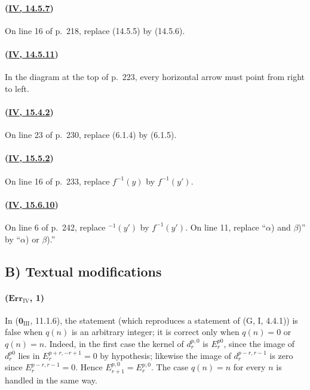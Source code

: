 \paragraph{({\texorpdfstring{\protect\hyperref[IV.14.5.7]{\textbf{IV}, 14.5.7}}{IV, 14.5.7}})}
On line 16 of p.~218, replace (14.5.5) by (14.5.6).

\paragraph{({\texorpdfstring{\protect\hyperref[IV.14.5.11]{\textbf{IV}, 14.5.11}}{IV, 14.5.11}})}
In the diagram at the top of p.~223, every horizontal arrow must point
from right to left.

\paragraph{({\texorpdfstring{\protect\hyperref[IV.15.4.2]{\textbf{IV}, 15.4.2}}{IV, 15.4.2}})}
On line 23 of p.~230, replace (6.1.4) by (6.1.5).

\paragraph{({\texorpdfstring{\protect\hyperref[IV.15.5.2]{\textbf{IV}, 15.5.2}}{IV, 15.5.2}})}
On line 16 of p.~233, replace $f^{-1}(y)$ by $f^{-1}(y')$.

\paragraph{({\texorpdfstring{\protect\hyperref[IV.15.6.10]{\textbf{IV}, 15.6.10}}{IV, 15.6.10}})}
On line 6 of p.~242, replace ${}^{-1}(y')$ by $f^{-1}(y')$.  On line
11, replace ``$\alpha$) and $\beta$)'' by ``$\alpha$) or $\beta$).''

\subsection*{B) Textual modifications}

\paragraph{($\mathbf{Err}_{\mathrm{IV}}$, 1)}
In ($\mathbf{0}_{\mathrm{III}}$, 11.1.6), the statement (which reproduces a
statement of (G, I, 4.4.1)) is false when $q(n)$ is an arbitrary integer;
it is correct only when $q(n)=0$ or $q(n)=n$.  Indeed, in the first case
the kernel of $d_r^{p,0}$ is $E_r^{p0}$, since the image of
$d_r^{p0}$ lies in $E_r^{p+r,-r+1}=0$ by hypothesis; likewise the
image of $d_r^{p-r,r-1}$ is zero since $E_r^{p-r,r-1}=0$.  Hence
$E_{r+1}^{p,0}=E_r^{p,0}$.  The case $q(n)=n$ for every $n$ is handled
in the same way.

